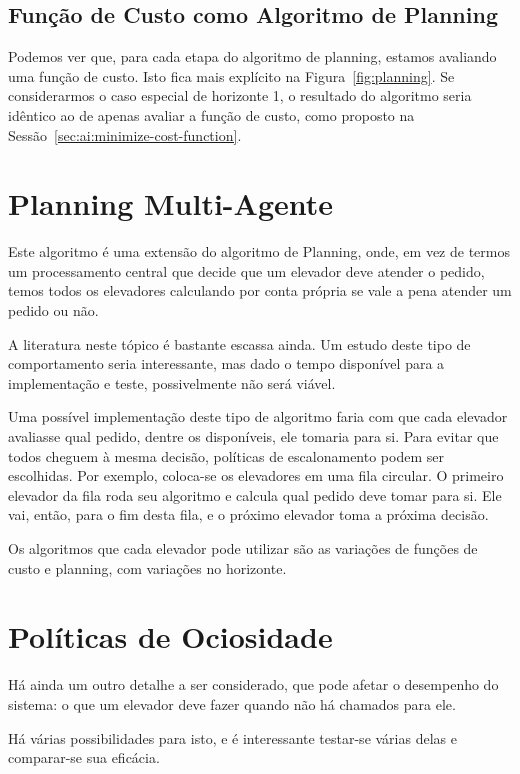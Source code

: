 \subsection{Função de Custo como Algoritmo de Planning}

Podemos ver que, para cada etapa do algoritmo de planning, estamos avaliando uma
função de custo. Isto fica mais explícito na Figura~\ref{fig:planning}. Se
considerarmos o caso especial de horizonte 1, o resultado do algoritmo seria
idêntico ao de apenas avaliar a função de custo, como proposto na
Sessão~\ref{sec:ai:minimize-cost-function}.

\section{Planning Multi-Agente}

Este algoritmo é uma extensão do algoritmo de Planning, onde, em vez de termos
um processamento central que decide que um elevador deve atender o pedido, temos
todos os elevadores calculando por conta própria se vale a pena atender um
pedido ou não.

A literatura neste tópico é bastante escassa ainda. Um estudo deste tipo de
comportamento seria interessante, mas dado o tempo disponível para a
implementação e teste, possivelmente não será viável.

Uma possível implementação deste tipo de algoritmo faria com que cada elevador
avaliasse qual pedido, dentre os disponíveis, ele tomaria para si. Para evitar
que todos cheguem à mesma decisão, políticas de escalonamento podem ser
escolhidas. Por exemplo, coloca-se os elevadores em uma fila circular. O
primeiro elevador da fila roda seu algoritmo e calcula qual pedido deve tomar
para si. Ele vai, então, para o fim desta fila, e o próximo elevador toma a
próxima decisão.

Os algoritmos que cada elevador pode utilizar são as variações de funções de
custo e planning, com variações no horizonte.

\section{Políticas de Ociosidade}

Há ainda um outro detalhe a ser considerado, que pode afetar o desempenho do
sistema: o que um elevador deve fazer quando não há chamados para ele.

Há várias possibilidades para isto, e é interessante testar-se várias delas e
comparar-se sua eficácia.

